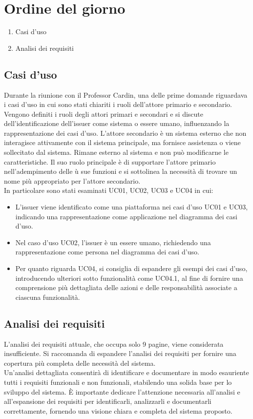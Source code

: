 \section{Ordine del giorno}
\begin{enumerate}
\item Casi d'uso
\item Analisi dei requisiti
\end{enumerate}

\subsection{Casi d'uso}
Durante la riunione con il Professor Cardin, una delle prime domande riguardava i casi d'uso in cui sono stati chiariti i ruoli dell'attore primario e secondario.
Vengono definiti i ruoli degli attori primari e secondari e si discute dell'identificazione dell'issuer come sistema o essere umano, 
influenzando la rappresentazione dei casi d'uso.
L'attore secondario è un sistema esterno che non interagisce attivamente con il sistema principale, ma fornisce assistenza o viene sollecitato dal sistema. 
Rimane esterno al sistema e non può modificarne le caratteristiche. Il suo ruolo principale è di supportare l'attore primario nell'adempimento delle ù
sue funzioni e si sottolinea la necessità di trovare un nome più appropriato per l'attore secondario.
\\In particolare sono stati esaminati UC01, UC02, UC03 e UC04 in cui:
\begin{itemize}
  \item L'issuer viene identificato come una piattaforma nei casi d'uso UC01 e UC03, indicando una rappresentazione come applicazione nel diagramma dei casi d'uso. 
  \item Nel caso d'uso UC02, l'issuer è un essere umano, richiedendo una rappresentazione come persona nel diagramma dei casi d'uso.
  \item Per quanto riguarda UC04, si consiglia di espandere gli esempi dei casi d'uso, introducendo ulteriori sotto funzionalità come UC04.1, al fine di fornire una comprensione più dettagliata delle azioni e delle responsabilità associate a ciascuna funzionalità.
\end{itemize}

\subsection{Analisi dei requisiti}
L'analisi dei requisiti attuale, che occupa solo 9 pagine, viene considerata insufficiente. Si raccomanda di espandere l'analisi dei requisiti per fornire una copertura più completa delle necessità del sistema.
\\ Un'analisi dettagliata consentirà di identificare e documentare in modo esauriente tutti i requisiti funzionali e non funzionali, stabilendo una solida base per lo sviluppo del sistema.
È importante dedicare l'attenzione necessaria all'analisi e all'espansione dei requisiti per identificarli, analizzarli e documentarli correttamente, fornendo una visione chiara e completa del sistema proposto.
